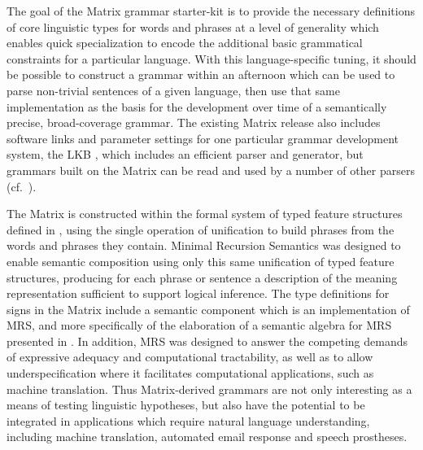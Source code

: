 \documentclass[12pt]{article}
\begin{document}
The goal of the Matrix grammar starter-kit is to provide the necessary
definitions of core linguistic types for words and phrases at a level
of generality which enables quick specialization to encode the
additional basic grammatical constraints for a particular language.
With this language-specific tuning, it should be possible to construct
a grammar within an afternoon which can be used to parse non-trivial
sentences of a given language, then use that same implementation as
the basis for the development over time of a semantically precise,
broad-coverage grammar.  The existing Matrix release also includes
software links and parameter settings for one particular grammar
development system, the LKB \cite{Copestake:02}, which includes an
efficient parser and generator, but grammars built on the Matrix can
be read and used by a number of other parsers
(cf.~).

The Matrix is constructed within the formal system of typed feature
structures defined in \cite{Carpenter:92}, using the single operation
of unification to build phrases from the words and phrases they
contain.  Minimal Recursion Semantics was designed to enable semantic
composition using only this same unification of typed feature
structures, producing for each phrase or sentence a description of the
meaning representation sufficient to support logical inference.  The
type definitions for signs in the Matrix include a semantic component
which is an implementation of MRS, and more specifically of the
elaboration of a semantic algebra for MRS presented in
.  In addition, MRS was designed to answer the
competing demands of expressive adequacy and computational
tractability, as well as to allow underspecification where it
facilitates computational applications, such as machine translation.
Thus Matrix-derived grammars are not only interesting as a means of
testing linguistic hypotheses, but also have the potential to be
integrated in applications which require natural language
understanding, including machine translation, automated email response
and speech prostheses.
\end{document}
